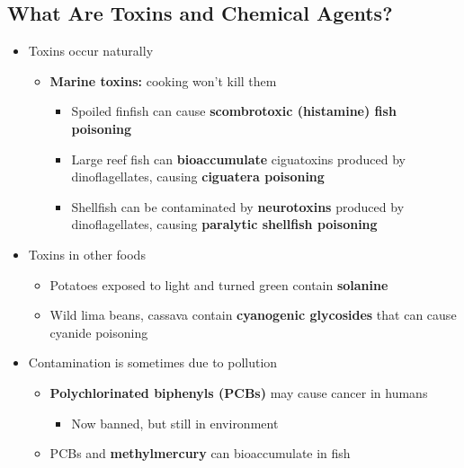 \documentclass[12pt]{article}
\begin{document}
        \subsection{What Are Toxins and Chemical Agents?}
            \begin{itemize}
                \item Toxins occur naturally
                    \begin{itemize}
                        \item \textbf{Marine toxins:} cooking won't kill them
                            \begin{itemize}
                                \item Spoiled finfish can cause \textbf{scombrotoxic (histamine) fish poisoning}
                                \item Large reef fish can \textbf{bioaccumulate} ciguatoxins produced by dinoflagellates, causing \textbf{ciguatera poisoning}
                                \item Shellfish can be contaminated by \textbf{neurotoxins} produced by dinoflagellates, causing \textbf{paralytic shellfish poisoning}
                            \end{itemize}
                    \end{itemize}
                \item Toxins in other foods
                    \begin{itemize}
                        \item Potatoes exposed to light and turned green contain \textbf{solanine}
                        \item Wild lima beans, cassava contain \textbf{cyanogenic glycosides} that can cause cyanide poisoning
                    \end{itemize}
                \item Contamination is sometimes due to pollution
                    \begin{itemize}
                        \item \textbf{Polychlorinated biphenyls (PCBs)} may cause cancer in humans
                            \begin{itemize}
                                \item Now banned, but still in environment
                            \end{itemize}
                        \item PCBs and \textbf{methylmercury} can bioaccumulate in fish
                    \end{itemize}
            \end{itemize}
\end{document}
